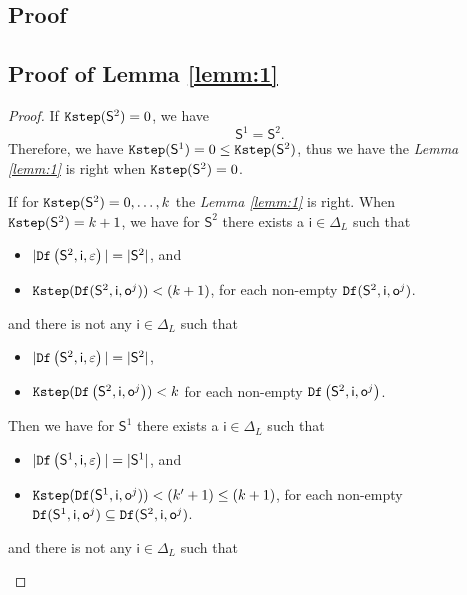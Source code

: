 \begin{appendices}
\section{Proof}
\label{sec:pro}
\subsection{Proof of Lemma \ref{lemm:1}}
\begin{proof}
If ${\tt Kstep}(\mathsf{S}^{2})=0$, we have  \[\mathsf{S}^{1} = \mathsf{S}^{2}.\] Therefore, we have ${\tt Kstep}(\mathsf{S}^{1})=0\le{\tt Kstep}(\mathsf{S}^{2})$, thus we have the {\em Lemma \ref{lemm:1}} is right when ${\tt Kstep}(\mathsf{S}^{2})=0$.
 
 If for ${\tt Kstep}(\mathsf{S}^{2})=0,\ldots, k$ the {\em Lemma \ref{lemm:1}} is right. When ${\tt Kstep}(\mathsf{S}^{2})=k+1$, we have for $\mathsf{S}^{2}$ there exists a $\mathsf{i}\in \Delta_L$ such that
 \begin{itemize}
 \item  $|{\tt Df}\left(\mathsf{S}^{2},\mathsf{i},\varepsilon\right)|=|\mathsf{S}^{2}|$, and 
 \item  ${\tt Kstep}({\tt Df}(\mathsf{S}^{2},\mathsf{i},\mathsf{o}^{j}))<(k+1)$, for each non-empty ${\tt Df}(\mathsf{S}^{2},\mathsf{i},\mathsf{o}^{j})$.
 \end{itemize}
 and there is not any $\mathsf{i} \in \Delta_L$ such that
  \begin{itemize}
 \item  $|{\tt Df}\left(\mathsf{S}^{2},\mathsf{i},\varepsilon\right)|=|\mathsf{S}^2|$,
 \item  ${\tt Kstep}({\tt Df}\left(\mathsf{S}^{2},\mathsf{i},\mathsf{o}^{j}\right))< k$ for each non-empty ${\tt Df}\left(\mathsf{S}^{2},\mathsf{i},\mathsf{o}^{j}\right)$.
 \end{itemize} 
 Then we have for $\mathsf{S}^{1}$ there exists a $\mathsf{i}\in \Delta_L$ such that
 \begin{itemize}
 \item  $|{\tt Df}\left(\mathsf{S}^{1},\mathsf{i},\varepsilon\right)|=|\mathsf{S}^{1}|$, and 
 \item  ${\tt Kstep}({\tt Df}(\mathsf{S}^{1},\mathsf{i},\mathsf{o}^{j}))<(k'+1)\le (k+1)$, for each non-empty ${\tt Df}(\mathsf{S}^{1},\mathsf{i},\mathsf{o}^{j})\subseteq {\tt Df}(\mathsf{S}^{2},\mathsf{i},\mathsf{o}^{j})$.
 \end{itemize}
 and there is not any $\mathsf{i} \in \Delta_L$ such that
  \begin{itemize}

\end{itemize}
\end{proof}
\end{appendices}
